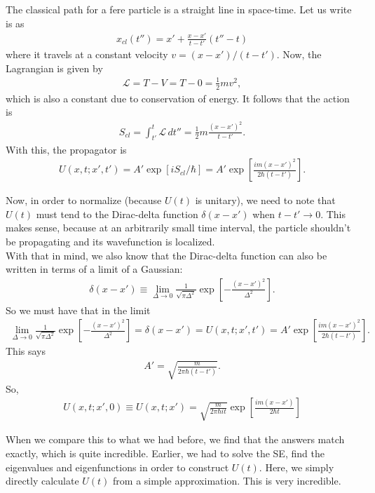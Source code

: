 \documentclass{book}
\theoremstyle{definition}
\newcommand{\lag}{\mathcal{L}}
\newcommand{\f}[2]{\frac{#1}{#2}}
\newcommand{\lb}{\left[}
\newcommand{\rb}{\right]}
\begin{document}
The classical path for a fere particle is a straight line in space-time. Let us write is as
\begin{align}
x_{cl}(t'') = x' + \f{x-x'}{t-t'}(t'' - t)
\end{align}
where it travels at a constant velocity $v = (x - x') / (t - t')$. Now, the Lagrangian is given by
\begin{align}
\lag = T - V = T - 0 = \f{1}{2}mv^2,
\end{align}
which is also a constant due to conservation of energy. It follows that the action is 
\begin{align}
S_{cl} = \int_{t'}^t \lag \,dt'' = \f{1}{2}m\f{(x-x')^2}{t-t'}.
\end{align}
With this, the propagator is 
\begin{align}
U(x,t;x',t') = A' \exp[iS_{cl}/\hbar] = A' \exp \lb \f{im(x-x')^2}{2\hbar (t - t')} \rb.
\end{align}

Now, in order to normalize (because $U(t)$ is unitary), we need to note that $U(t)$ must tend to the Dirac-delta function $\delta(x - x')$ when $t - t' \to 0$. This makes sense, because at an arbitrarily small time interval, the particle shouldn't be propagating and its wavefunction is localized. \\

With that in mind, we also know that the Dirac-delta function can also be written in terms of a limit of a Gaussian:
\begin{align}
\delta(x - x') \equiv \lim_{\Delta \to 0} \f{1}{\sqrt{\pi \Delta^2}} \exp\lb -\f{(x-x')^2}{\Delta^2} \rb.
\end{align}
So we must have that in the limit
\begin{align}
\lim_{\Delta \to 0} \f{1}{\sqrt{\pi \Delta^2}} \exp\lb -\f{(x-x')^2}{\Delta^2} \rb = \delta(x-x') = U(x,t;x',t') = A' \exp\lb \f{im(x-x')^2}{2\hbar(t-t')} \rb.
\end{align}
This says
\begin{align}
A' = \sqrt{\f{m}{2\pi \hbar(t-t')}}.
\end{align}
So,
\begin{align}
\boxed{U(x,t; x',0) \equiv U(x,t;x') = \sqrt{\f{m}{2\pi\hbar it}}\exp\lb \f{im(x-x')}{2\hbar t} \rb}
\end{align}

When we compare this to what we had before, we find that the answers match exactly, which is quite incredible. Earlier, we had to solve the SE, find the eigenvalues and eigenfunctions in order to construct $U(t)$. Here, we simply directly calculate $U(t)$ from a simple approximation. This is very incredible.\\
\end{document}
